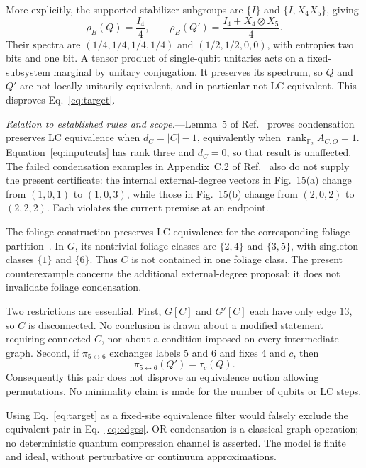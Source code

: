 \documentclass[aps,pra,reprint,amsmath,amssymb,longbibliography]{revtex4-2}
\newcommand{\rank}{\operatorname{rank}}
\begin{document}
More explicitly, the supported stabilizer subgroups are $\{I\}$ and $\{I,X_4X_5\}$, giving
\begin{equation}
 \rho_B(Q)=\frac{I_4}{4},\qquad
 \rho_B(Q')=\frac{I_4+X_4\otimes X_5}{4}.
 \label{eq:marginals}
\end{equation}
Their spectra are $(1/4,1/4,1/4,1/4)$ and $(1/2,1/2,0,0)$, with entropies two bits and one bit. A tensor product of single-qubit unitaries acts on a fixed-subsystem marginal by unitary conjugation. It preserves its spectrum, so $Q$ and $Q'$ are not locally unitarily equivalent, and in particular not LC equivalent. This disproves Eq.~\eqref{eq:target}.

\emph{Relation to established rules and scope.}---Lemma~5 of Ref.~\cite{Vandre2025} proves condensation preserves LC equivalence when $d_C=|C|-1$, equivalently when $\rank_{\mathbb F_2}A_{C,O}=1$. Equation~\eqref{eq:inputcuts} has rank three and $d_C=0$, so that result is unaffected. The failed condensation examples in Appendix~C.2 of Ref.~\cite{Vandre2025} also do not supply the present certificate: the internal external-degree vectors in Fig.~15(a) change from $(1,0,1)$ to $(1,0,3)$, while those in Fig.~15(b) change from $(2,0,2)$ to $(2,2,2)$. Each violates the current premise at an endpoint.

The foliage construction preserves LC equivalence for the corresponding foliage partition~\cite{Burchardt2025}. In $G$, its nontrivial foliage classes are $\{2,4\}$ and $\{3,5\}$, with singleton classes $\{1\}$ and $\{6\}$. Thus $C$ is not contained in one foliage class. The present counterexample concerns the additional external-degree proposal; it does not invalidate foliage condensation.

Two restrictions are essential. First, $G[C]$ and $G'[C]$ each have only edge $13$, so $C$ is disconnected. No conclusion is drawn about a modified statement requiring connected $C$, nor about a condition imposed on every intermediate graph. Second, if $\pi_{5\leftrightarrow6}$ exchanges labels 5 and 6 and fixes 4 and $c$, then
\begin{equation}
 \pi_{5\leftrightarrow6}(Q')=\tau_c(Q).\label{eq:permutation}
\end{equation}
Consequently this pair does not disprove an equivalence notion allowing permutations. No minimality claim is made for the number of qubits or LC steps.

Using Eq.~\eqref{eq:target} as a fixed-site equivalence filter would falsely exclude the equivalent pair in Eq.~\eqref{eq:edges}. OR condensation is a classical graph operation; no deterministic quantum compression channel is asserted. The model is finite and ideal, without perturbative or continuum approximations.
\end{document}
